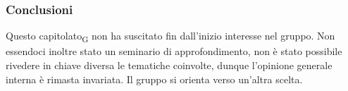 \subsubsection{Conclusioni}

Questo \gls{capitolato}\textsubscript{G} non ha suscitato fin dall'inizio interesse nel gruppo. Non essendoci inoltre stato un seminario di approfondimento, non è stato possibile rivedere in chiave diversa le tematiche coinvolte, dunque l'opinione generale interna è rimasta invariata. Il gruppo si orienta verso un'altra scelta.




